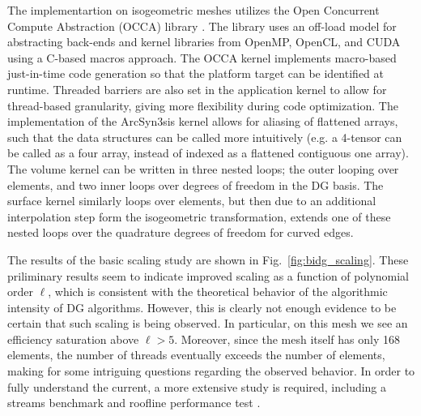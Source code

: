 The implementartion on isogeometric meshes utilizes the Open Concurrent Compute Abstraction (OCCA) library \cite{MedinaPress}.  The library uses an off-load model for abstracting back-ends and kernel libraries from OpenMP, OpenCL, and CUDA using a C-based macros approach.  The OCCA kernel implements macro-based just-in-time code generation so that the platform target can be identified at runtime.  Threaded barriers are also set in the application kernel to allow for thread-based granularity, giving more flexibility during code optimization.  The implementation of the ArcSyn3sis kernel allows for aliasing of flattened arrays, such that the data structures can be called more intuitively (e.g. a 4-tensor can be called as a four array, instead of indexed as a flattened contiguous one array).  The volume kernel can be written in three nested loops; the outer looping over elements, and two inner loops over degrees of freedom in the DG basis.  The surface kernel similarly loops over elements, but then due to an additional interpolation step form the isogeometric transformation, extends one of these nested loops over the quadrature degrees of freedom for curved edges.

The results of the basic scaling study are shown in Fig.~\ref{fig:bidg_scaling}.  These priliminary results seem to indicate improved scaling as a function of polynomial order $\ell$, which is consistent with the theoretical behavior of the algorithmic intensity of DG algorithms.  However, this is clearly not enough evidence to be certain that such scaling is being observed.  In particular, on this mesh we see an efficiency saturation above $\ell>5$.  Moreover, since the mesh itself has only 168 elements, the number of threads eventually exceeds the number of elements, making for some intriguing questions regarding the observed behavior.  In order to fully understand the current, a more extensive study is required, including a streams benchmark \cite{McCalpin1995} and roofline performance test \cite{Williams:2009:RIV:1498765.1498785}.


%
%






